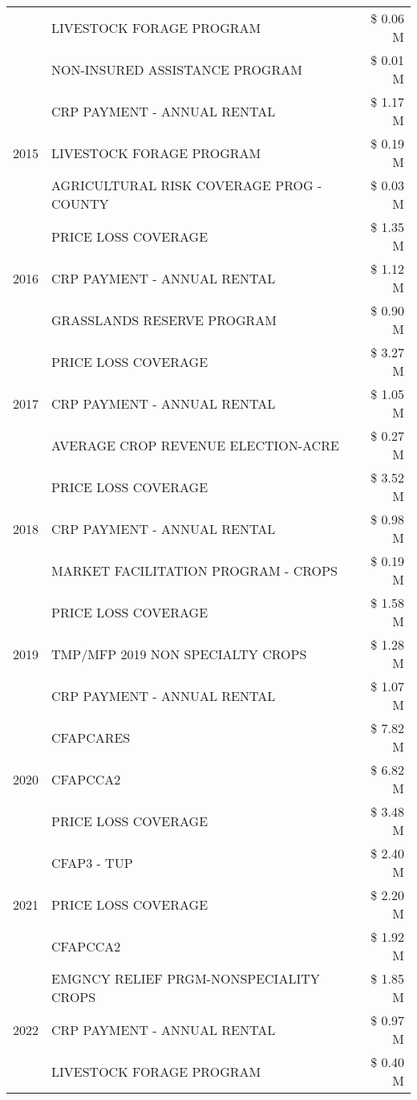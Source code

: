 \begin{tabular}{llr}
 & LIVESTOCK FORAGE PROGRAM & \$ 0.06 M \\
 & NON-INSURED ASSISTANCE PROGRAM & \$ 0.01 M \\
\cline{1-3}
\multirow[t]{3}{*}{2015} & CRP PAYMENT - ANNUAL RENTAL & \$ 1.17 M \\
 & LIVESTOCK FORAGE PROGRAM & \$ 0.19 M \\
 & AGRICULTURAL RISK COVERAGE PROG - COUNTY & \$ 0.03 M \\
\cline{1-3}
\multirow[t]{3}{*}{2016} & PRICE LOSS COVERAGE & \$ 1.35 M \\
 & CRP PAYMENT - ANNUAL RENTAL & \$ 1.12 M \\
 & GRASSLANDS RESERVE PROGRAM & \$ 0.90 M \\
\cline{1-3}
\multirow[t]{3}{*}{2017} & PRICE LOSS COVERAGE & \$ 3.27 M \\
 & CRP PAYMENT - ANNUAL RENTAL & \$ 1.05 M \\
 & AVERAGE CROP REVENUE ELECTION-ACRE & \$ 0.27 M \\
\cline{1-3}
\multirow[t]{3}{*}{2018} & PRICE LOSS COVERAGE & \$ 3.52 M \\
 & CRP PAYMENT - ANNUAL RENTAL & \$ 0.98 M \\
 & MARKET FACILITATION PROGRAM - CROPS & \$ 0.19 M \\
\cline{1-3}
\multirow[t]{3}{*}{2019} & PRICE LOSS COVERAGE & \$ 1.58 M \\
 & TMP/MFP 2019 NON SPECIALTY CROPS & \$ 1.28 M \\
 & CRP PAYMENT - ANNUAL RENTAL & \$ 1.07 M \\
\cline{1-3}
\multirow[t]{3}{*}{2020} & CFAPCARES & \$ 7.82 M \\
 & CFAPCCA2 & \$ 6.82 M \\
 & PRICE LOSS COVERAGE & \$ 3.48 M \\
\cline{1-3}
\multirow[t]{3}{*}{2021} & CFAP3 - TUP & \$ 2.40 M \\
 & PRICE LOSS COVERAGE & \$ 2.20 M \\
 & CFAPCCA2 & \$ 1.92 M \\
\cline{1-3}
\multirow[t]{3}{*}{2022} & EMGNCY RELIEF PRGM-NONSPECIALITY CROPS & \$ 1.85 M \\
 & CRP PAYMENT - ANNUAL RENTAL & \$ 0.97 M \\
 & LIVESTOCK FORAGE PROGRAM & \$ 0.40 M \\
\cline{1-3}
\bottomrule
\end{tabular}
